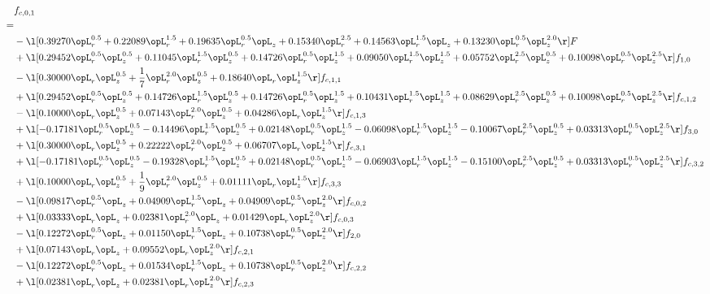\begin{alignat}{2} 
\label{eq:f_01_2} 
& f_{c,0,1} \nonumber \\ 
 = \\ 
& - \l[  0.39270 \opL_r^{0.5} +  0.22089 \opL_r^{1.5} +  0.19635 \opL_r^{0.5} \opL_z +  0.15340 \opL_r^{2.5} +  0.14563 \opL_r^{1.5} \opL_z +  0.13230 \opL_r^{0.5} \opL_z^{2.0}  \r] F \nonumber \\ 
& + \l[  0.29452 \opL_r^{0.5} \opL_z^{0.5} +  0.11045 \opL_r^{1.5} \opL_z^{0.5} +  0.14726 \opL_r^{0.5} \opL_z^{1.5} +  0.09050 \opL_r^{1.5} \opL_z^{1.5} +  0.05752 \opL_r^{2.5} \opL_z^{0.5} +  0.10098 \opL_r^{0.5} \opL_z^{2.5}  \r] f_{1,0} \nonumber \\ 
& - \l[  0.30000 \opL_r \opL_z^{0.5} + \frac{1}{7} \opL_r^{2.0} \opL_z^{0.5} +  0.18640 \opL_r \opL_z^{1.5}  \r] f_{c,1,1} \nonumber \\ 
& + \l[  0.29452 \opL_r^{0.5} \opL_z^{0.5} +  0.14726 \opL_r^{1.5} \opL_z^{0.5} +  0.14726 \opL_r^{0.5} \opL_z^{1.5} +  0.10431 \opL_r^{1.5} \opL_z^{1.5} +  0.08629 \opL_r^{2.5} \opL_z^{0.5} +  0.10098 \opL_r^{0.5} \opL_z^{2.5}  \r] f_{c,1,2} \nonumber \\ 
& - \l[  0.10000 \opL_r \opL_z^{0.5} +  0.07143 \opL_r^{2.0} \opL_z^{0.5} +  0.04286 \opL_r \opL_z^{1.5}  \r] f_{c,1,3} \nonumber \\ 
& + \l[  -0.17181 \opL_r^{0.5} \opL_z^{0.5}   -0.14496 \opL_r^{1.5} \opL_z^{0.5} +  0.02148 \opL_r^{0.5} \opL_z^{1.5}   -0.06098 \opL_r^{1.5} \opL_z^{1.5}   -0.10067 \opL_r^{2.5} \opL_z^{0.5} +  0.03313 \opL_r^{0.5} \opL_z^{2.5}  \r] f_{3,0} \nonumber \\ 
& + \l[  0.30000 \opL_r \opL_z^{0.5} +  0.22222 \opL_r^{2.0} \opL_z^{0.5} +  0.06707 \opL_r \opL_z^{1.5}  \r] f_{c,3,1} \nonumber \\ 
& + \l[  -0.17181 \opL_r^{0.5} \opL_z^{0.5}   -0.19328 \opL_r^{1.5} \opL_z^{0.5} +  0.02148 \opL_r^{0.5} \opL_z^{1.5}   -0.06903 \opL_r^{1.5} \opL_z^{1.5}   -0.15100 \opL_r^{2.5} \opL_z^{0.5} +  0.03313 \opL_r^{0.5} \opL_z^{2.5}  \r] f_{c,3,2} \nonumber \\ 
& + \l[  0.10000 \opL_r \opL_z^{0.5} + \frac{1}{9} \opL_r^{2.0} \opL_z^{0.5} +  0.01111 \opL_r \opL_z^{1.5}  \r] f_{c,3,3} \nonumber \\ 
& - \l[  0.09817 \opL_r^{0.5} \opL_z +  0.04909 \opL_r^{1.5} \opL_z +  0.04909 \opL_r^{0.5} \opL_z^{2.0}  \r] f_{c,0,2} \nonumber \\ 
& + \l[  0.03333 \opL_r \opL_z +  0.02381 \opL_r^{2.0} \opL_z +  0.01429 \opL_r \opL_z^{2.0}  \r] f_{c,0,3} \nonumber \\ 
& - \l[  0.12272 \opL_r^{0.5} \opL_z +  0.01150 \opL_r^{1.5} \opL_z +  0.10738 \opL_r^{0.5} \opL_z^{2.0}  \r] f_{2,0} \nonumber \\ 
& + \l[  0.07143 \opL_r \opL_z +  0.09552 \opL_r \opL_z^{2.0}  \r] f_{c,2,1} \nonumber \\ 
& - \l[  0.12272 \opL_r^{0.5} \opL_z +  0.01534 \opL_r^{1.5} \opL_z +  0.10738 \opL_r^{0.5} \opL_z^{2.0}  \r] f_{c,2,2} \nonumber \\ 
& + \l[  0.02381 \opL_r \opL_z +  0.02381 \opL_r \opL_z^{2.0}  \r] f_{c,2,3} \nonumber \\ 
\end{alignat} 


